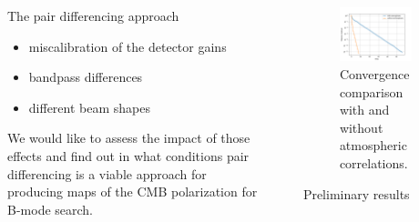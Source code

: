 \documentclass[final]{beamer}
\newlength{\sepwidth}
\newlength{\colwidth}
\newcommand{\separatorcolumn}{\begin{column}{\sepwidth}\end{column}}
\begin{document}
\begin{frame}[t]
\begin{columns}[t]
\begin{column}{\colwidth}
\begin{alertblock}{The pair differencing approach}
        \begin{itemize}
          \item miscalibration of the detector gains
          \item bandpass differences
          \item different beam shapes
        \end{itemize}

        We would like to assess the impact of those effects and find out in what conditions pair differencing is a viable approach for producing maps of the CMB polarization for B-mode search.

      \end{alertblock}

    \end{column}

    \separatorcolumn

    \begin{column}{\colwidth}

      \begin{figure}
        \centering
        \includegraphics[width=0.8\textwidth]{figures/convergence.png}
        \caption{Convergence comparison with and without atmospheric correlations.}
        \label{fig:convergence}
      \end{figure}

      \begin{block}{Preliminary results}



\end{block}
\end{column}
\end{columns}
\end{frame}
\end{document}
